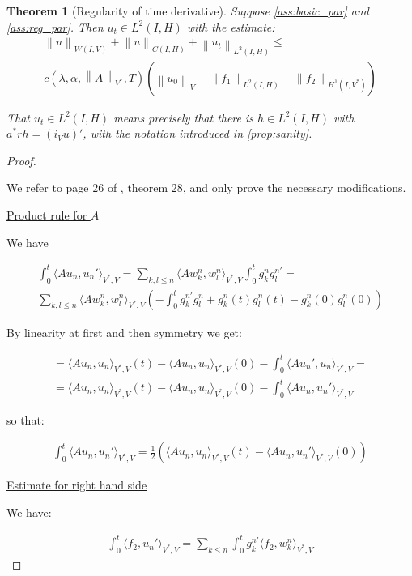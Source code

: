 \documentclass[english,a4paper,10pt,oneside]{scrbook}	%
\theoremstyle{break}
\newtheorem{thm}[equation]{Theorem}
\newenvironment{mproof}[1][\proofname]{%
  \begin{proof}[#1]$ $\par\nobreak\ignorespaces
}{%
  \end{proof}
}
\renewcommand*{\proofname}{Proof}
\theoremstyle{remark}
\newcommand{\norm}[1]{\left\lVert#1\right\rVert}
\newcommand{\VN}[1]{\norm{#1}_{V}}
\newcommand{\VSN}[1]{\norm{#1}_{V^*}}
\begin{document}
\begin{thm}[Regularity of time derivative]
\label{thm:reg_time}
Suppose \cref{ass:basic_par} and \cref{ass:reg_par}. Then $u_t \in L^2(I, H)$ with the estimate:
\begin{align}
	\norm{u}_{W(I,V)} + \norm{u}_{C(I,H)} + \norm{u_t}_{L^2(I,H)} \leq\\ c(\lambda, \alpha, \VSN{A}, T)(\VN{u_0}+\norm{f_1}_{L^2(I,H)} + \norm{f_2}_{H^1(I,V^*)})
\end{align}

That $u_t \in L^2(I, H)$ means precisely that there is $h \in L^2(I,H)$ with $a^* r h = (i_V u)'$, with the notation introduced in \cref{prop:sanity}.

\end{thm}
\begin{mproof}
We refer to page 26 of \cite{gilardi}, theorem 28, and only prove the necessary modifications.

\underline{Product rule for $A$}

We have 

\begin{align*}
\int_0^t \langle Au_n,u_n' \rangle_{V^*,V} = \sum_{k,l\leq n} \langle Aw^n_k,w^n_l \rangle_{V^*,V} \int_0^t g_k^n g_l^{n '} = \\
\sum_{k,l\leq n} \langle Aw^n_k,w^n_l \rangle_{V^*,V} \left (-\int_0^t g_k^{n'} g_l^n + g_k^n(t) g_l^n(t)-g_k^n(0) g_l^n(0) \right )
\end{align*}

By linearity at first and then symmetry we get:

\begin{align*}
	= \langle Au_n,u_n \rangle_{V^*,V}(t)-\langle Au_n,u_n \rangle_{V^*,V}(0)-\int_0^t\langle Au_n',u_n \rangle_{V^*,V}=\\
	= \langle Au_n,u_n \rangle_{V^*,V}(t)-\langle Au_n,u_n \rangle_{V^*,V}(0)-\int_0^t\langle Au_n,u_n' \rangle_{V^*,V}
\end{align*}

so that:

\begin{align*}
	\int_0^t \langle Au_n,u_n' \rangle_{V^*,V} = \frac{1}{2}\left( \langle Au_n,u_n \rangle_{V^*,V}(t)-\langle Au_n,u_n' \rangle_{V^*,V}(0) \right )
\end{align*}

\underline{Estimate for right hand side}

We have:

\begin{align*}
	\int_0^t \langle f_2,u_n' \rangle_{V^*,V} = \sum_{k\leq n}\int_0^tg_k^{n'}\langle f_2,w_k^n \rangle_{V^*,V}
\end{align*}


\end{mproof}
\end{document}
